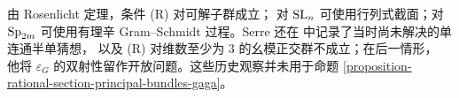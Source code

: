 \begin{remark}[例子与历史边界]
\label{remark-rational-section-condition-examples}
由 Rosenlicht 定理，条件 \textup{(R)} 对可解子群成立；
对 $\mathop{\rm SL}_n$ 可使用行列式截面；对 $\mathop{\rm Sp}_{2m}$
可使用有理辛 Gram--Schmidt 过程。Serre 还在
\cite[\S 4，第 20 号]{GAGA} 中记录了当时尚未解决的单连通半单猜想，
以及 \textup{(R)} 对维数至少为 $3$ 的幺模正交群不成立；在后一情形，
他将 $\varepsilon_G$ 的双射性留作开放问题。这些历史观察并未用于命题
\ref{proposition-rational-section-principal-bundles-gaga}。
\end{remark}







